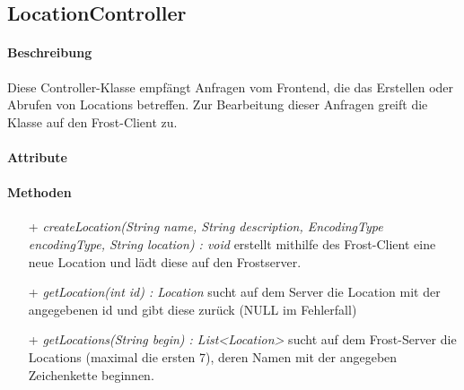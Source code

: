 \subsection{LocationController}

\paragraph{Beschreibung}
Diese Controller-Klasse empfängt Anfragen vom Frontend, die das Erstellen oder Abrufen von Locations betreffen. Zur Bearbeitung dieser Anfragen greift die Klasse auf den Frost-Client zu.


\paragraph{Attribute}

\paragraph{Methoden}
\begin{itemize}
\item[+] \textit{ createLocation(String name, String description, EncodingType encodingType, String location) : void }
erstellt mithilfe des Frost-Client eine neue Location und lädt diese auf den Frostserver.
\item[+] \textit{getLocation(int id) : Location}
sucht auf dem Server die Location mit der angegebenen id und gibt diese zurück (NULL im Fehlerfall)
\item[+] \textit{getLocations(String begin) : List<Location> }
sucht auf dem Frost-Server die Locations (maximal die ersten 7), deren Namen mit der angegeben Zeichenkette beginnen.
\end{itemize}